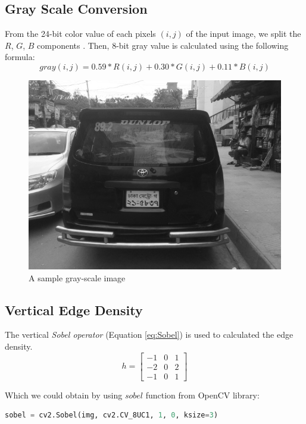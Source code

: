 \documentclass{standalone}
\begin{document}
\subsection{Gray Scale Conversion}
From the 24-bit color value of each pixels $(i, j)$ of the input image, we split the $R$, $G$, $B$ components . Then, 8-bit gray value is calculated using the following formula:
\begin{equation}
gray(i,j) = 0.59 * R(i,j) + 0.30 * G(i,j) + 0.11 * B(i, j)
\end{equation}
\begin{figure}
	\centering
	\includegraphics[width=.8\linewidth]{./img/sample/stage1.jpg}
	\caption{A sample gray-scale image} 
	 \label{fig:GraySample}
\end{figure}


\subsection{Vertical Edge Density}
The vertical {\it Sobel operator} (Equation \ref{eq:Sobel}) is used to calculated the edge density. 
\begin{equation} \label{eq:Sobel}
h =
  \begin{bmatrix}
    -1 & 0 & 1\\
    -2 & 0 & 2\\
    -1 & 0 & 1
  \end{bmatrix} 
\end{equation}

Which we could obtain by using $sobel$ function from OpenCV library:
\begin{lstlisting}[language=Python]
sobel = cv2.Sobel(img, cv2.CV_8UC1, 1, 0, ksize=3)
\end{lstlisting}
\end{document}
